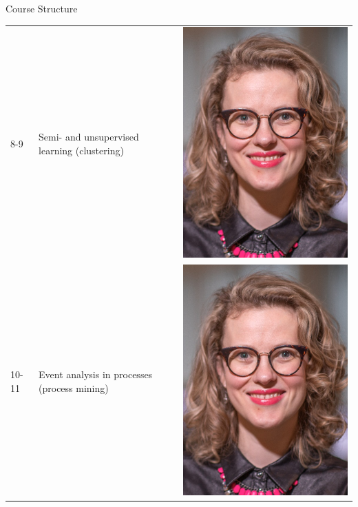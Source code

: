 \documentclass[
    NAME={Dr. Helga Ingimundardóttir},
    EMAIL={helgaingim@hi.is},
    FACULTY={Industrial Engineering},
    TITLE={Business Intelligence},
    SUBTITLE={Introduction},
    SEMINAR={IÐN610M},
    DATE={Spring, 2024}
]{HI-LaTeX/hi-beamer}
\begin{document}
\begin{frame}{Course Structure}
\begin{table}
\begin{tabular}{m{1.5cm} m{8cm} m{2.5cm}}
                8-9           & Semi- and unsupervised learning (clustering)  & \includegraphics[height=.1\textheight]{figures/helgaingim} \\
                10-11         & Event analysis in processes (process mining)  & \includegraphics[height=.1\textheight]{figures/helgaingim} \\

\end{tabular}
\end{table}
\end{frame}
\end{document}
